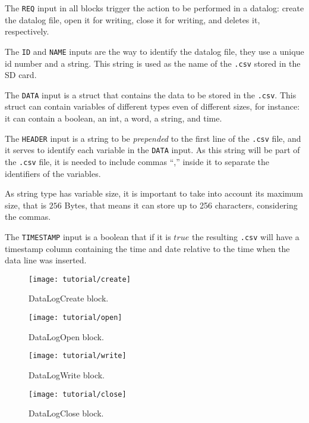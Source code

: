 The \verb|REQ| input in all blocks trigger the action to be performed in a
datalog: create the datalog file,
open it for writing, close it for writing, and deletes it, respectively.

The
\verb|ID| and \verb|NAME| inputs are the way to identify the datalog file, they
use a unique id number and a string. This string is used as the name of the
\verb|.csv| stored in the SD card.

The \verb|DATA| input is a struct that contains the data to be stored in the
\verb|.csv|. This struct can contain variables of different types even of
different sizes, for instance: it can contain a boolean,
an int, a word,
a string, and time.

The \verb|HEADER| input is a string to be \emph{prepended} to the first line of
the \verb|.csv| file, and it serves to identify each variable in the \verb|DATA|
input. As this string will be part of the \verb|.csv| file, it is needed to
include commas ``,'' inside it to separate the identifiers of the variables.

\begin{observation}
  \label{obs:stringSize}
 As string type has variable size, it is important to take into account its
 maximum size, that is $256$ Bytes, that means it can store up to 256 characters,
 considering the commas.
\end{observation}

The \verb|TIMESTAMP| input is a boolean that if it is $true$ the resulting
\verb|.csv| will have a timestamp column containing the time and date relative
to the time when the data line was inserted. 

\begin{figure}[H] \centering
 \texttt{[image: tutorial/create]}
  \caption{DataLogCreate block.}
  \label{fig:datalogcreate}
\end{figure}

\begin{figure}[H] \centering
 \texttt{[image: tutorial/open]}
\caption{DataLogOpen block.}
  \label{fig:datalogopen}
\end{figure}

\begin{figure}[H] \centering
	\texttt{[image: tutorial/write]}
	\caption{DataLogWrite block.}
	\label{fig:datalogwrite}
\end{figure}

\begin{figure}[H] \centering
 \texttt{[image: tutorial/close]}
  \caption{DataLogClose block.}
  \label{fig:datalogclose}
\end{figure}

